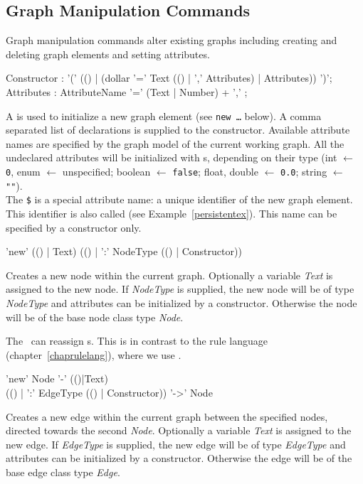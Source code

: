 \subsection{Graph Manipulation Commands}
\label{mani}
Graph manipulation commands alter existing graphs including creating and deleting graph elements and setting attributes.

\begin{rail}
  Constructor : '(' (() | (dollar '=' Text (() | ',' Attributes) | Attributes)) ')';
  Attributes : AttributeName '=' (Text | Number) + ',' ;
\end{rail}\indexmain{\texttt{\$}}
A  is used to initialize a new graph element (see \texttt{new \dots} below). A comma separated list of  declarations is supplied to the constructor. Available attribute names are specified by the graph model of the current working graph. All the undeclared attributes will be initialized with s, depending on their type (int $\leftarrow$ \texttt{0}, enum $\leftarrow$ unspecified; boolean $\leftarrow$ \texttt{false}; float, double $\leftarrow$ \texttt{0.0}; string $\leftarrow$ \texttt{""}).\\
The \texttt{\$} is a special attribute name: a unique identifier of the new graph element. This identifier is also called  (see Example~\ref{persistentex}). This name can be specified by a constructor only.

\begin{rail}
  'new' (() | Text) (() | ':' NodeType (() | Constructor))
\end{rail}
Creates a new node within the current graph. Optionally a variable \emph{Text} is assigned to the new node. If \emph{NodeType} is supplied, the new node will be of type \emph{NodeType} and attributes can be initialized by a constructor. Otherwise the node will be of the base node class type \emph{Node}.
\begin{note}
The \GrShell\ can reassign s. 
This is in contrast to the rule language (chapter~\ref{chaprulelang}), where we use \emph{}.
\end{note}

\begin{rail}
  'new' Node '-' (()|Text) \\ (() | ':' EdgeType (() | Constructor)) '->' Node
\end{rail}
Creates a new edge within the current graph between the specified nodes, directed towards the second \emph{Node}. Optionally a variable \emph{Text} is assigned to the new edge. If \emph{EdgeType} is supplied, the new edge will be of type \emph{EdgeType} and attributes can be initialized by a constructor. Otherwise the edge will be of the base edge class type \emph{Edge}.

